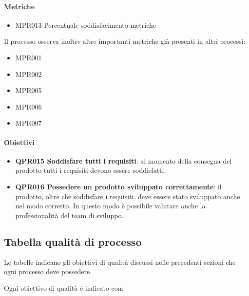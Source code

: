     \paragraph{Metriche}
    \begin{itemize}
        \item MPR013 Percentuale soddisfacimento metriche
    \end{itemize}
    Il processo osserva inoltre altre importanti metriche già presenti in altri processi:
    \begin{itemize}
        \item MPR001
        \item MPR002
        \item MPR005
        \item MPR006
        \item MPR007
    \end{itemize}

    \paragraph{Obiettivi}
    \begin{itemize}
        \item \textbf{QPR015 Soddisfare tutti i requisiti}: al momento della consegna del prodotto tutti i requisiti devono essere soddisfatti.
        \item \textbf{QPR016 Possedere un prodotto sviluppato correttamente}: il prodotto, oltre che soddisfare i requisiti, deve essere stato sviluppato anche nel modo corretto. In questo modo è possibile valutare anche la professionalità del team di sviluppo. 
    \end{itemize}

\subsection{Tabella qualità di processo}
Le tabelle indicano gli obiettivi di qualità discussi nelle precedenti sezioni che ogni processo deve possedere.

Ogni obiettivo di qualità è indicato con:

